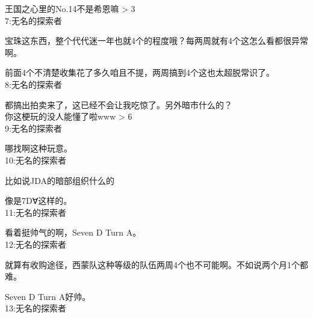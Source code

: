 王国之心里的No.14不是希恩嘛 > 3\\

7:无名的探索者

宝珠这东西，整个代代迷一年也就4个的程度哦？每两周就有4个这怎么看都很异常啊。

前面4个不清楚收集花了多久咱且不提，两周搞到4个这也太超脱常识了。\\

8:无名的探索者

都搞出拍卖来了，这已经不会让我吃惊了。另外暗市什么的？\\

你这梗玩的没人能懂了啦www > 6\\

9:无名的探索者

哪找啊这种玩意。\\

10:无名的探索者

比如说JDA的暗部组织什么的

像是7Dꓯ这样的。\\

11:无名的探索者

看着挺帅气的啊，Seven D Turn A。\\

12:无名的探索者

就算有收购途径，西蒙队这种等级的队伍两周4个也不可能啊。不如说两个月1个都难。

Seven D Turn A好帅。\\

13:无名的探索者

